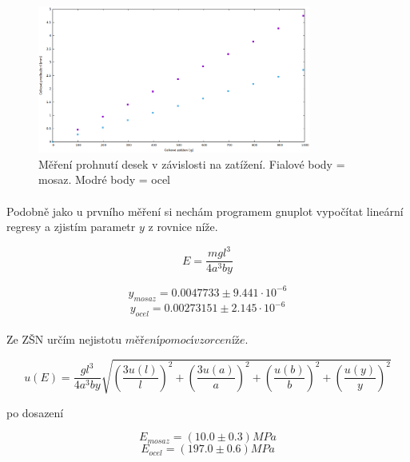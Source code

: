 \documentclass[a4paper,11pt]{article}
\begin{document}
        \begin{figure}[h]
            \centering
            \includegraphics[width=0.8\textwidth]{mereni2.png}
            \caption{Měření prohnutí desek v závislosti na zatížení. Fialové body = mosaz. 
                Modré body = ocel}
            \label{fig:mereni2}
        \end{figure}

        \paragraph{} Podobně jako u prvního měření si nechám programem gnuplot vypočítat
            lineární regresy a zjistím parametr $y$ z rovnice níže.

        \begin{equation}
            E = \frac{m g l^{3}}{4 a^{3} b y}
        \end{equation}

        $$y_{mosaz} = 0.0047733 \pm 9.441 \cdot 10 ^{-6}$$
        $$y_{ocel} = 0.00273151 \pm 2.145 \cdot 10 ^{-6}$$

        \paragraph{} Ze ZŠN určím nejistotu $měření pomocí vzorce níže$.

        \begin{equation}
            u(E) = \frac{g l^{3}}{4 a^{3} b y} \sqrt{\left( \frac{3u(l)}{l} \right) ^{2} 
                + \left( \frac{ 3 u(a)}{a} \right) ^{2}
                + \left( \frac{u(b)}{b} \right) ^{2} 
                + \left( \frac{u(y)}{y} \right) ^{2} }
        \end{equation}

        po dosazení

        $$E_{mosaz} = (10.0 \pm 0.3) MPa$$
        $$E_{ocel} = (197.0 \pm 0.6) MPa$$
\end{document}
